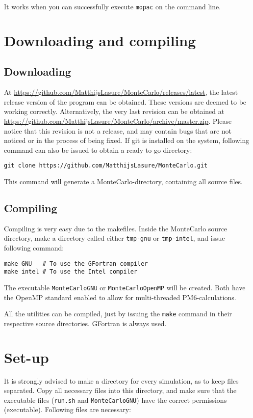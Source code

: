 It works when you can successfully execute \verb|mopac| on the command line.

\section{Downloading and compiling}

\subsection{Downloading}
At \url{https://github.com/MatthijsLasure/MonteCarlo/releases/latest}, the 
latest release version of the program can be obtained. These versions are 
deemed to be working correctly.
Alternatively, the very last revision can be obtained at 
\url{https://github.com/MatthijsLasure/MonteCarlo/archive/master.zip}.
Please notice that this revision is not a release, and may contain bugs that 
are not noticed or in the process of being fixed. If git is installed on the 
system, following command can also be issued to obtain a ready to go directory:

\begin{lstlisting}[caption=Clone with git]
git clone https://github.com/MatthijsLasure/MonteCarlo.git
\end{lstlisting}

This command will generate a MonteCarlo-directory, containing all source files.

\subsection{Compiling}
Compiling is very easy due to the makefiles.
Inside the MonteCarlo source directory, make a directory called either 
\verb|tmp-gnu| or \verb|tmp-intel|, and issue following command:

\begin{lstlisting}[caption=Compiling the main program]
make GNU   # To use the GFortran compiler
make intel # To use the Intel compiler
\end{lstlisting}

The executable \verb|MonteCarloGNU| or \verb|MonteCarloOpenMP| will be created.
Both have the OpenMP standard enabled to allow for multi-threaded 
PM6-calculations.

All the utilities can be compiled, just by issuing the \verb|make| command in 
their respective source directories. GFortran is always used.

\section{Set-up}
It is strongly advised to make a directory for every simulation, as to keep 
files separated. Copy all necessary files into this directory, and make sure 
that the executable files (\verb|run.sh| and \verb|MonteCarloGNU|) have the 
correct permissions (executable). Following files are necessary:


